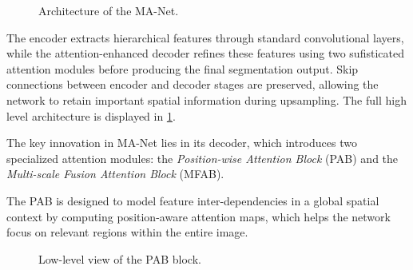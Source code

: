 \begin{figure}[!ht]
    \centering
    \caption{Architecture of the MA-Net. }
    \label{fig:MAnet}
\end{figure}


The encoder extracts hierarchical features through standard convolutional layers, while the attention-enhanced decoder refines these features using two sufisticated attention modules before producing the final segmentation output. Skip connections between encoder and decoder stages are preserved, allowing the network to retain important spatial information during upsampling. The full high level architecture is displayed in \ref{fig:MAnet}.


The key innovation in MA-Net lies in its decoder, which introduces two specialized attention modules: the \textit{Position-wise Attention Block} (PAB) and the \textit{Multi-scale Fusion Attention Block} (MFAB). 

The PAB is designed to model feature inter-dependencies in a global spatial context by computing position-aware attention maps, which helps the network focus on relevant regions within the entire image. 

\begin{figure}[!ht]
    \centering
    \caption{Low-level view of the PAB block.}
    \label{fig:PAB}
\end{figure}

